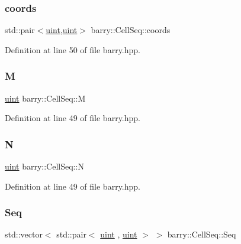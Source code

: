 \subsubsection{\texorpdfstring{coords}{coords}}
{\footnotesize\ttfamily std\+::pair$<$\hyperlink{namespacebarry_a11dfc53ddb4672278319aa04f1e09a6c}{uint},\hyperlink{namespacebarry_a11dfc53ddb4672278319aa04f1e09a6c}{uint}$>$ barry\+::\+Cell\+Seq\+::coords\hspace{0.3cm}{\ttfamily [protected]}}



Definition at line 50 of file barry.\+hpp.

\mbox{\label{classbarry_1_1_cell_seq_acd15aaca4fc9160a7e89d68cec310fba}} 
\subsubsection{\texorpdfstring{M}{M}}
{\footnotesize\ttfamily \hyperlink{namespacebarry_a11dfc53ddb4672278319aa04f1e09a6c}{uint} barry\+::\+Cell\+Seq\+::M\hspace{0.3cm}{\ttfamily [protected]}}



Definition at line 49 of file barry.\+hpp.

\mbox{\label{classbarry_1_1_cell_seq_aa870f5b3789fc9abe1399351f443ccb0}} 
\subsubsection{\texorpdfstring{N}{N}}
{\footnotesize\ttfamily \hyperlink{namespacebarry_a11dfc53ddb4672278319aa04f1e09a6c}{uint} barry\+::\+Cell\+Seq\+::N\hspace{0.3cm}{\ttfamily [protected]}}



Definition at line 49 of file barry.\+hpp.

\mbox{\label{classbarry_1_1_cell_seq_a4fa35bd68111dc58761e74aa1f9f01d3}} 
\subsubsection{\texorpdfstring{Seq}{Seq}}
{\footnotesize\ttfamily std\+::vector$<$ std\+::pair$<$ \hyperlink{namespacebarry_a11dfc53ddb4672278319aa04f1e09a6c}{uint} , \hyperlink{namespacebarry_a11dfc53ddb4672278319aa04f1e09a6c}{uint} $>$ $>$ barry\+::\+Cell\+Seq\+::\+Seq\hspace{0.3cm}{\ttfamily [protected]}}



